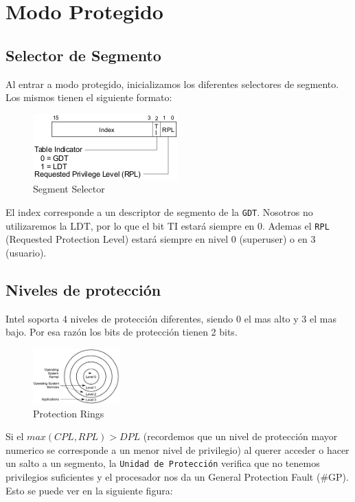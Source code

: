 \section{Modo Protegido}

\subsection{Selector de Segmento}
Al entrar a modo protegido, inicializamos los diferentes selectores de segmento. Los mismos tienen el siguiente formato:

\begin{figure}[h!]
  \centering
    \includegraphics[scale=0.8]{images/segment_selector}
  \caption{Segment Selector}
\end{figure}

El index corresponde a un descriptor de segmento de la \texttt{GDT}. Nosotros no utilizaremos la LDT, por lo que el bit TI estará siempre en 0. Ademas el \texttt{RPL} (Requested Protection Level) estará siempre en nivel 0 (superuser) o en 3 (usuario).

\subsection{Niveles de protección}

Intel soporta 4 niveles de protección diferentes, siendo 0 el mas alto y 3 el mas bajo. Por esa razón los bits de protección tienen 2 bits.

\begin{figure}[h!]
  \centering
    \includegraphics[width=0.3\textwidth]{images/protection_rings}
  \caption{Protection Rings}
\end{figure}

Si el $max(CPL, RPL) > DPL$ (recordemos que un nivel de protección mayor numerico se corresponde a un menor nivel de privilegio) al querer acceder o hacer un salto a un segmento, la \texttt{Unidad de Protección} verifica que no tenemos privilegios suficientes y el procesador nos da un General Protection Fault (\#GP). Esto se puede ver en la siguiente figura:

